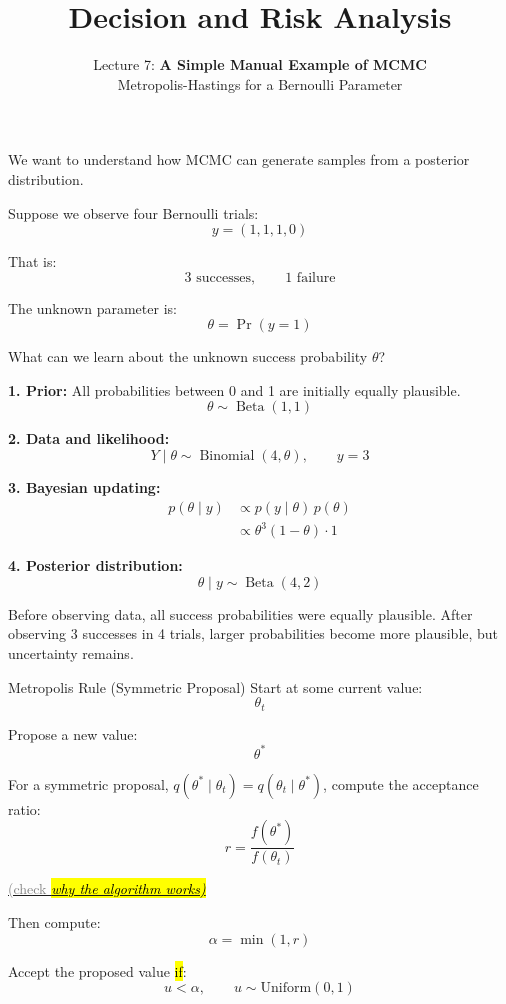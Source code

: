 \documentclass[aspectratio=43,11pt]{beamer}
\title{Decision and Risk Analysis}
\subtitle{Lecture 7: \textbf{A Simple Manual Example of MCMC}\\
Metropolis-Hastings for a Bernoulli Parameter}
\author{}
\date{
\color{aggiemaroon}{
DAEN 427 / ISEN 427 / ISEN 627 - Fall 2026\\
\textbf{Alexander Abuabara}
}
}
\begin{document}
\begin{frame}[plain]
  \titlepage
\end{frame}

\begin{frame}{}
We want to understand how MCMC can generate samples from a posterior distribution.

\vspace{0.4cm}
Suppose we observe four Bernoulli trials:
\[
 y = (1,1,1,0)
\]

That is:
\[
 3 \text{ successes}, \qquad 1 \text{ failure}
\]

\vspace{0.3cm}
The unknown parameter is:
\[
\theta = \Pr(y=1)
\]
\end{frame}

\begin{frame}{}
What can we learn about the unknown success probability $\theta$?

\vspace{0.2cm}

\textbf{1. Prior:} All probabilities between 0 and 1
are initially equally plausible.
\[
\theta \sim \operatorname{Beta}(1,1)
\]

\textbf{2. Data and likelihood:}
\[
Y \mid \theta \sim \operatorname{Binomial}(4,\theta),
\qquad y=3
\]

\textbf{3. Bayesian updating:}
\[
\begin{aligned}
p(\theta \mid y)
&\propto p(y \mid \theta)\,p(\theta)\\
&\propto \theta^3(1-\theta)\cdot 1
\end{aligned}
\]

\textbf{4. Posterior distribution:}
\[
\boxed{\theta \mid y \sim \operatorname{Beta}(4,2)}
\]

Before observing data, all success probabilities were equally
plausible. After observing 3 successes in 4 trials, larger
probabilities become more plausible, but uncertainty remains.

\end{frame}

\begin{frame}{Metropolis Rule (Symmetric Proposal)}
Start at some current value:
\[
\theta_t
\]

Propose a new value:
\[
\theta^*
\]

For a symmetric proposal, $q(\theta^*\mid\theta_t)=q(\theta_t\mid\theta^*)$,
compute the acceptance ratio:
\[
 r = \frac{f(\theta^*)}{f(\theta_t)}
\]

\href{https://www.bayesrulesbook.com/chapter-7\#why-the-algorithm-works}{\footnotesize \textcolor{gray}{(check \hl{\it why the algorithm works)}}}

Then compute:
\[
 \alpha = \min(1,r)
\]

Accept the proposed value \hl{if}:
\[
 u < \alpha, \qquad u \sim \text{Uniform}(0,1)
\]
\end{frame}
\end{document}
